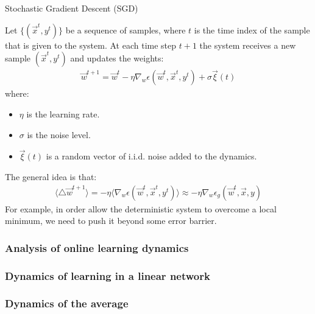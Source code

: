 \documentclass[11pt]{book} %
\begin{document}
\begin{algorithm}[H]
    \SetAlgoLined
    \caption{Stochastic Gradient Descent (SGD)}
    Let $\{ (\vec{x}^t, y^t) \}$ be a sequence of samples, where $t$ is the time index of the sample that is given to the system.
    At each time step $t+1$ the system receives a new sample $(\vec{x}^{t}, y^{t})$ and updates the weights: 
    \begin{align*}
        \vec{w}^{t+1} = \vec{w}^{t} - \eta \nabla_w \epsilon(\vec{w}^{t}, \vec{x}^{t}, y^{t}) + \sigma \vec{\xi}(t) 
    \end{align*}
    where: 
    \begin{itemize}
        \item $\eta$ is the learning rate.
        \item $\sigma$ is the noise level.
        \item $\vec{\xi}(t)$ is a random vector of i.i.d. noise added to the dynamics.
    \end{itemize}
\end{algorithm}

The general idea is that:
\begin{align*}
    \langle \bigtriangleup \vec{w}^{t+1} \rangle = - \eta \langle \nabla_w \epsilon(\vec{w}^{t}, \vec{x}^{t}, y^{t}) \rangle \approx -\eta \nabla_w \epsilon_g (\vec{w}^{t}, \vec{x}, y) 
\end{align*}
For example, in order allow the deterministic system to overcome a local minimum, we need to push it beyond some error barrier.

%
%



%
%

\subsubsection{Analysis of online learning dynamics}


%
%

\subsubsection{Dynamics of learning in a linear network}


%
%

\subsubsection{Dynamics of the average}


%
%
\end{document}
